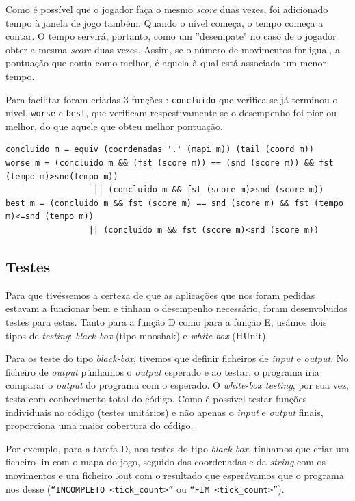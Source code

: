 \documentclass[a4paper]{article}
\begin{document}
\begin{itemize}
Como é possível que o jogador faça o mesmo \emph{score} duas vezes, foi adicionado tempo à janela de jogo também. Quando o nível começa, o tempo começa a contar. O tempo servirá, portanto, como um ''desempate" no caso de o jogador obter a mesma \emph{score} duas vezes. Assim, se o número de movimentos for igual, a pontuação que conta como melhor, é aquela à qual está associada um menor tempo. 

Para facilitar foram criadas 3 funções : \texttt{concluido} que verifica se já terminou o nivel, \texttt{worse} e \texttt{best}, que verificam respestivamente se o desempenho foi pior ou melhor, do que aquele que obteu melhor pontuação.

{\footnotesize
\begin{Verbatim}
concluido m = equiv (coordenadas '.' (mapi m)) (tail (coord m))
worse m = (concluido m && (fst (score m)) == (snd (score m)) && fst (tempo m)>snd(tempo m))
                  || (concluido m && fst (score m)>snd (score m))
best m = (concluido m && fst (score m) == snd (score m) && fst (tempo m)<=snd (tempo m))
                 || (concluido m && fst (score m)<snd (score m))
\end{Verbatim}}

\end{itemize}

\subsection{Testes}

Para que tivéssemos a certeza de que as aplicações que nos foram pedidas estavam a funcionar bem e tinham o desempenho necessário, foram desenvolvidos testes para estas. Tanto para a função D como para a função E, usámos dois tipos de \emph{testing}: \emph{black-box} (tipo mooshak) e \emph{white-box} (HUnit).

Para os teste do tipo \emph{black-box}, tivemos que definir ficheiros de \emph{input} e \emph{output}. No ficheiro de \emph{output} púnhamos o \emph{output} esperado e ao testar, o programa iria comparar o \emph{output} do programa com o esperado. O \emph{white-box testing}, por sua vez, testa com conhecimento total do código. Como é possível testar funções individuais no código (testes unitários) e não apenas o \emph{input} e \emph{output} finais, proporciona uma maior cobertura do código.

Por exemplo, para a tarefa D, nos testes do tipo \emph{black-box}, tínhamos que criar um ficheiro .in com o mapa do jogo, seguido das coordenadas e da \emph{string} com os movimentos e um ficheiro .out com o resultado que esperávamos que o programa nos desse (\texttt{``INCOMPLETO <tick\_count>''} ou \texttt{``FIM <tick\_count>''}).
\end{document}
